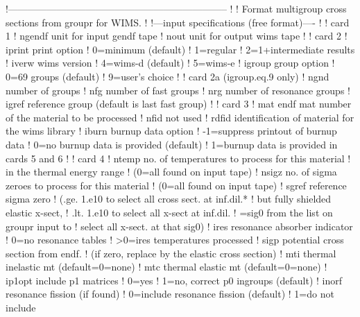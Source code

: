 \small
\begin{ccode}

   !--------------------------------------------------------------------
   !
   ! Format multigroup cross sections from groupr for WIMS.
   !
   !---input specifications (free format)----
   !
   ! card 1
   !    ngendf  unit for input gendf tape
   !    nout    unit for output wims tape
   !
   ! card 2
   !    iprint  print option
   !               0=minimum (default)
   !               1=regular
   !               2=1+intermediate results
   !    iverw   wims version
   !               4=wims-d (default)
   !               5=wims-e
   !    igroup  group option
   !               0=69 groups (default)
   !               9=user's choice
   !
   ! card 2a  (igroup.eq.9 only)
   !    ngnd    number of groups
   !    nfg     number of fast groups
   !    nrg     number of resonance groups
   !    igref   reference group (default is last fast group)
   !
   ! card 3
   !    mat     endf mat number of the material to be processed
   !    nfid    not used
   !    rdfid   identification of material for the wims library
   !    iburn   burnup data option
   !              -1=suppress printout of burnup data
   !               0=no burnup data is provided (default)
   !               1=burnup data is provided in cards 5 and 6
   !
   ! card  4
   !    ntemp   no. of temperatures to process for this material
   !            in the thermal energy range
   !               (0=all found on input tape)
   !    nsigz   no. of sigma zeroes to process for this material
   !               (0=all found on input tape)
   !    sgref   reference sigma zero
   !               (.ge. 1.e10 to select all cross sect. at inf.dil.*
   !                           but fully shielded elastic x-sect,
   !                .lt. 1.e10 to select all x-sect at inf.dil.
   !                =sig0      from the list on groupr input to
   !                           select all x-sect. at that sig0)
   !    ires    resonance absorber indicator
   !               0=no resonance tables
   !              >0=ires temperatures processed
   !    sigp    potential cross section from endf.
   !               (if zero, replace by the elastic cross section)
   !    mti     thermal inelastic mt (default=0=none)
   !    mtc     thermal elastic mt (default=0=none)
   !    ip1opt  include p1 matrices
   !               0=yes
   !               1=no, correct p0 ingroups (default)
   !    inorf   resonance fission (if found)
   !               0=include resonance fission (default)
   !               1=do not include

\end{ccode}
